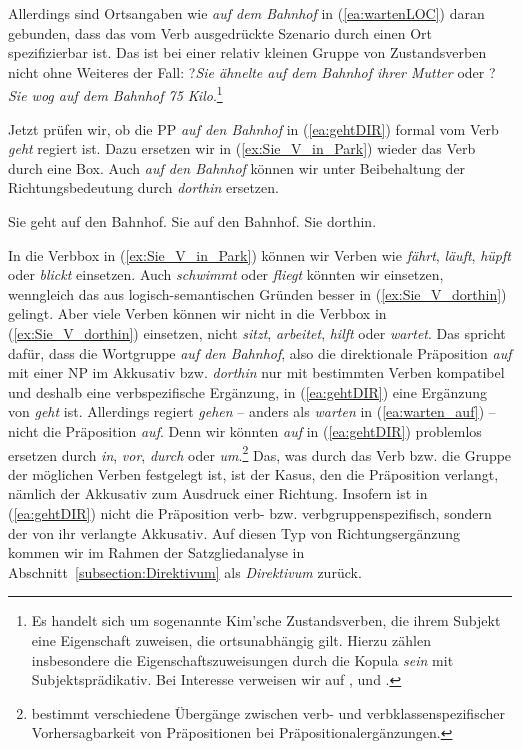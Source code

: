 Allerdings sind Ortsangaben wie \textit{auf dem Bahnhof} in (\ref{ea:wartenLOC}) daran gebunden, dass das vom Verb ausgedrückte Szenario durch einen Ort spezifizierbar ist. Das ist bei einer relativ kleinen Gruppe von Zustandsverben nicht ohne Weiteres der Fall: ?\textit{Sie ähnelte auf dem Bahnhof ihrer Mutter} oder ?\textit{Sie wog auf dem Bahnhof 75 Kilo}.\footnote{Es handelt sich um sogenannte Kim’sche Zustandsverben, die ihrem Subjekt eine Eigenschaft zuweisen, die ortsunabhängig gilt. Hierzu zählen insbesondere die Eigenschaftszuweisungen durch die Kopula \textit{sein} mit Subjektsprädikativ. Bei Interesse verweisen wir auf \citet{Maienborn2000}, \citet[116--122]{Maienborn2003} und \citet{Maienborn2007Kimian}.}
  
Jetzt prüfen wir, ob die PP \textit{auf den Bahnhof} in (\ref{ea:gehtDIR}) formal vom Verb \textit{geht} regiert ist. Dazu ersetzen wir in (\ref{ex:Sie_V_in_Park}) wieder das Verb durch eine Box. Auch \textit{auf den Bahnhof} können wir unter Beibehaltung der Richtungsbedeutung durch \textit{dorthin} ersetzen.

\ea \label{ea:Subkategorisierungstest5}
\ea \label{ea:gehtDIR} Sie geht auf den Bahnhof.
\ex \label{ex:Sie_V_in_Park} Sie \fbox{\phantom{geht}} auf den Bahnhof.
\ex \label{ex:Sie_V_dorthin} Sie \fbox{\phantom{geht}} dorthin.
\z 
\z   

In die Verbbox in (\ref{ex:Sie_V_in_Park}) können wir Verben wie \textit{fährt}, \textit{läuft}, \textit{hüpft} oder \textit{blickt} einsetzen. Auch \textit{schwimmt} oder \textit{fliegt} könnten wir einsetzen, wenngleich das aus logisch-semantischen Gründen besser in (\ref{ex:Sie_V_dorthin}) gelingt. Aber viele Verben können wir nicht in die Verbbox in (\ref{ex:Sie_V_dorthin}) einsetzen, \zB nicht \textit{sitzt}, \textit{arbeitet}, \textit{hilft} oder \textit{wartet}. Das spricht dafür, dass die Wortgruppe \textit{auf den Bahnhof}, also die direktionale Präposition \textit{auf} mit einer NP im Akkusativ bzw. \textit{dorthin} nur mit bestimmten Verben kompatibel und deshalb eine verbspezifische Ergänzung, in (\ref{ea:gehtDIR}) eine Ergänzung von \textit{geht} ist. Allerdings regiert \textit{gehen} -- anders als \textit{warten} in (\ref{ea:warten_auf}) -- nicht die Präposition \textit{auf}. Denn wir könnten \textit{auf} in (\ref{ea:gehtDIR}) problemlos ersetzen durch \textit{in}, \textit{vor}, \textit{durch} oder \textit{um}.\footnote{\citet[33]{Breindl1989} bestimmt verschiedene Übergänge zwischen verb- und verbklassenspezifischer Vorhersagbarkeit von Präpositionen bei Präpositionalergänzungen.} Das, was durch das Verb bzw. die Gruppe der möglichen Verben festgelegt ist, ist der Kasus, den die Präposition verlangt, nämlich der Akkusativ zum Ausdruck einer Richtung. Insofern ist in (\ref{ea:gehtDIR}) nicht die Präposition verb- bzw. verbgruppenspezifisch, sondern der von ihr verlangte Akkusativ. Auf diesen Typ von Richtungsergänzung kommen wir im Rahmen der Satzgliedanalyse in Abschnitt~\ref{subsection:Direktivum} als \textit{Direktivum} zurück.

